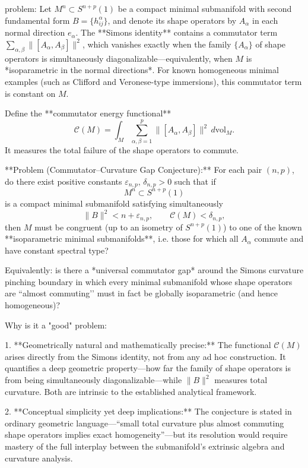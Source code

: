 problem:  
Let \(M^n \subset S^{n+p}(1)\) be a compact minimal submanifold with second fundamental form \(B = \{h_{ij}^\alpha\}\), and denote its shape operators by \(A_\alpha\) in each normal direction \(e_\alpha\).  
The **Simons identity** contains a commutator term \(\sum_{\alpha,\beta}\|[A_\alpha,A_\beta]\|^2\), which vanishes exactly when the family \(\{A_\alpha\}\) of shape operators is simultaneously diagonalizable—equivalently, when \(M\) is *isoparametric in the normal directions*.  For known homogeneous minimal examples (such as Clifford and Veronese-type immersions), this commutator term is constant on \(M\).

Define the **commutator energy functional**
\[
\mathcal{C}(M) = \int_M \sum_{\alpha,\beta=1}^p \|[A_\alpha,A_\beta]\|^2\, d\mathrm{vol}_M.
\]
It measures the total failure of the shape operators to commute.

**Problem (Commutator–Curvature Gap Conjecture):**  
For each pair \((n,p)\), do there exist positive constants \(\varepsilon_{n,p},\,\delta_{n,p}>0\) such that if  
\[
M^n \subset S^{n+p}(1)
\]
is a compact minimal submanifold satisfying simultaneously
\[
\|B\|^2 < n + \varepsilon_{n,p}, \qquad \mathcal{C}(M) < \delta_{n,p},
\]
then \(M\) must be congruent (up to an isometry of \(S^{n+p}(1)\)) to one of the known **isoparametric minimal submanifolds**, i.e. those for which all \(A_\alpha\) commute and have constant spectral type?

Equivalently: is there a *universal commutator gap* around the Simons curvature pinching boundary in which every minimal submanifold whose shape operators are “almost commuting’’ must in fact be globally isoparametric (and hence homogeneous)?

Why is it a "good" problem:

1. **Geometrically natural and mathematically precise:**  
   The functional \(\mathcal{C}(M)\) arises directly from the Simons identity, not from any ad hoc construction.  It quantifies a deep geometric property—how far the family of shape operators is from being simultaneously diagonalizable—while \(\|B\|^2\) measures total curvature.  Both are intrinsic to the established analytical framework.

2. **Conceptual simplicity yet deep implications:**  
   The conjecture is stated in ordinary geometric language—“small total curvature plus almost commuting shape operators implies exact homogeneity”—but its resolution would require mastery of the full interplay between the submanifold’s extrinsic algebra and curvature analysis.


